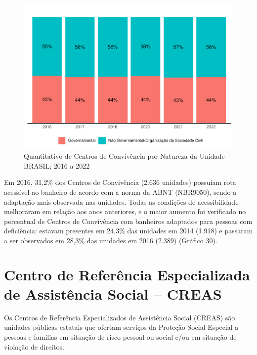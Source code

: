 \documentclass[
  brazilian]{report}
\begin{document}
\begin{figure}
\includegraphics{Censo-SUAS-2022_files/figure-latex/centro-conv-natureza-1} \caption[Quantitativo de Centros de Convivência por Natureza da Unidade - BRASIL]{Quantitativo de Centros de Convivência por Natureza da Unidade - BRASIL; 2016 a 2022}\label{fig:centro-conv-natureza}
\end{figure}

Em 2016, 31,2\% dos Centros de Convivência (2.636 unidades) possuíam
rota acessível ao banheiro de acordo com a norma da ABNT (NBR9050),
sendo a adaptação mais observada nas unidades. Todas as condições de
acessibilidade melhoraram em relação aos anos anteriores, e o maior
aumento foi verificado no percentual de Centros de Convivência com
banheiros adaptados para pessoas com deficiência: estavam presentes em
24,3\% das unidades em 2014 (1.918) e passaram a ser observados em
28,3\% das unidades em 2016 (2.389) (Gráfico 30).

\hypertarget{centro-de-referuxeancia-especializada-de-assistuxeancia-social-creas}{%
\section{Centro de Referência Especializada de Assistência Social --
CREAS}\label{centro-de-referuxeancia-especializada-de-assistuxeancia-social-creas}}

Os Centros de Referência Especializados de Assistência Social (CREAS)
são unidades públicas estatais que ofertam serviços da Proteção Social
Especial a pessoas e famílias em situação de risco pessoal ou social
e/ou em situação de violação de direitos.
\end{document}
